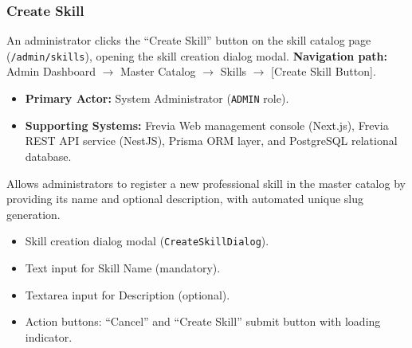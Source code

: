 \subsubsection{ Create Skill}

An administrator clicks the ``Create Skill'' button on the skill catalog page (\texttt{/admin/skills}), opening the skill creation dialog modal.\newline
\textbf{Navigation path:} Admin Dashboard $\rightarrow$ Master Catalog $\rightarrow$ Skills $\rightarrow$ [Create Skill Button].


\begin{itemize}[leftmargin=1.6em,topsep=3pt,itemsep=2pt,parsep=0pt,label=$\bullet$]
    \item \textbf{Primary Actor:} System Administrator (\texttt{ADMIN} role).
    \item \textbf{Supporting Systems:} Frevia Web management console (Next.js), Frevia REST API service (NestJS), Prisma ORM layer, and PostgreSQL relational database.
\end{itemize}

\noindent Allows administrators to register a new professional skill in the master catalog by providing its name and optional description, with automated unique slug generation.

\begin{itemize}[leftmargin=1.6em,topsep=3pt,itemsep=2pt,parsep=0pt,label=$\bullet$]
    \item Skill creation dialog modal (\texttt{CreateSkillDialog}).
    \item Text input for Skill Name (mandatory).
    \item Textarea input for Description (optional).
    \item Action buttons: ``Cancel'' and ``Create Skill'' submit button with loading indicator.
\end{itemize}

